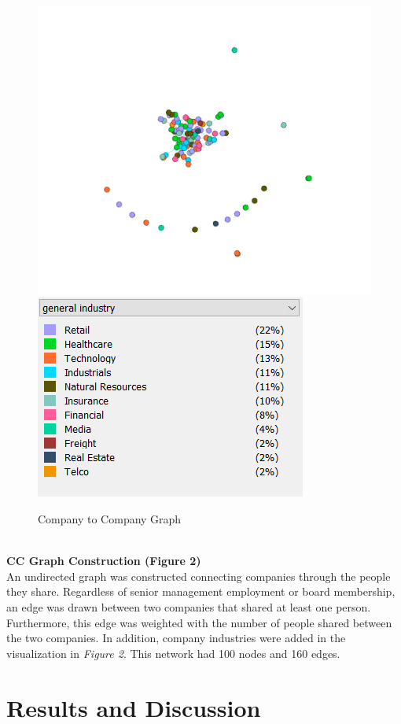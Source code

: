 \documentclass[a4paper]{article}
\begin{document}
    \begin{figure}[h]
        \centering
        \includegraphics[width=.6\linewidth]{./graphs/CC_by_industry.png}
        \includegraphics[width=.35\linewidth]{./graphs/CC_by_industry_legend.png}
        \caption{Company to Company Graph}
    \end{figure}\\
    \textbf{CC Graph Construction (Figure 2)}\\
    An undirected graph was constructed connecting companies through the people they share. Regardless of senior management employment or board membership, an edge was drawn between two companies that shared at least one person. Furthermore, this edge was weighted with the number of people shared between the two companies. In addition, company industries were added in the visualization in \textit{Figure 2}. This network had 100 nodes and 160 edges. 

\section*{Results and Discussion}
\end{document}
